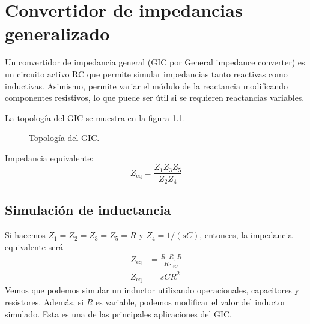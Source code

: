 \chapter{Convertidor de impedancias generalizado}

Un convertidor de impedancia general (GIC por General impedance converter) es un circuito activo RC que permite simular impedancias tanto reactivas como inductivas. Asimismo, permite variar el módulo de la reactancia modificando componentes resistivos, lo que puede ser útil si se requieren reactancias variables.

La topología del GIC se muestra en la figura \ref{fig_gic}.

\begin{figure}[!ht]
  \centering
  \caption{Topología del GIC.}
  \label{fig_gic}
\end{figure}

Impedancia equivalente:
\[
  Z_\text{eq}=\frac{Z_1Z_3Z_5}{Z_2Z_4}
\]
\section{Simulación de inductancia}

Si hacemos \(Z_1=Z_2=Z_3=Z_5=R\) y \(Z_4=1/(sC)\), entonces, la impedancia equivalente será
\begin{align*}
  Z_\text{eq}&=\frac{R\cdot R\cdot R}{R\cdot\frac{1}{sC}}\\
  Z_\text{eq}&=sCR^2
\end{align*}
Vemos que podemos simular un inductor utilizando operacionales, capacitores y resistores. Además, si \(R\) es variable, podemos modificar el valor del inductor simulado. Esta es una de las principales aplicaciones del GIC.


